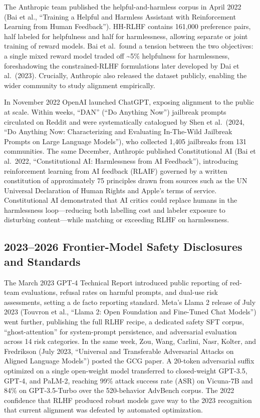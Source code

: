 \documentclass{article}
\begin{document}
The Anthropic team published the helpful-and-harmless corpus in April 2022 (Bai et al., ``Training a Helpful and Harmless Assistant with Reinforcement Learning from Human Feedback''). HH-RLHF contains 161,000 preference pairs, half labeled for helpfulness and half for harmlessness, allowing separate or joint training of reward models. Bai et al.~found a tension between the two objectives: a single mixed reward model traded off \textasciitilde5\% helpfulness for harmlessness, foreshadowing the constrained-RLHF formulations later developed by Dai et al.~(2023). Crucially, Anthropic also released the dataset publicly, enabling the wider community to study alignment empirically.

In November 2022 OpenAI launched ChatGPT, exposing alignment to the public at scale. Within weeks, ``DAN'' (``Do Anything Now'') jailbreak prompts circulated on Reddit and were systematically catalogued by Shen et al.~(2024, ``Do Anything Now: Characterizing and Evaluating In-The-Wild Jailbreak Prompts on Large Language Models''), who collected 1,405 jailbreaks from 131 communities. The same December, Anthropic published Constitutional AI (Bai et al.~2022, ``Constitutional AI: Harmlessness from AI Feedback''), introducing reinforcement learning from AI feedback (RLAIF) governed by a written constitution of approximately 75 principles drawn from sources such as the UN Universal Declaration of Human Rights and Apple's terms of service. Constitutional AI demonstrated that AI critics could replace humans in the harmlessness loop---reducing both labelling cost and labeler exposure to disturbing content---while matching or exceeding RLHF on harmlessness.

\subsection{2023--2026 Frontier-Model Safety Disclosures and Standards}\label{frontier-model-safety-disclosures-and-standards}

The March 2023 GPT-4 Technical Report introduced public reporting of red-team evaluations, refusal rates on harmful prompts, and dual-use risk assessments, setting a de facto reporting standard. Meta's Llama 2 release of July 2023 (Touvron et al., ``Llama 2: Open Foundation and Fine-Tuned Chat Models'') went further, publishing the full RLHF recipe, a dedicated safety SFT corpus, ``ghost-attention'' for system-prompt persistence, and adversarial evaluation across 14 risk categories. In the same week, Zou, Wang, Carlini, Nasr, Kolter, and Fredrikson (July 2023, ``Universal and Transferable Adversarial Attacks on Aligned Language Models'') posted the GCG paper. A 20-token adversarial suffix optimized on a single open-weight model transferred to closed-weight GPT-3.5, GPT-4, and PaLM-2, reaching 99\% attack success rate (ASR) on Vicuna-7B and 84\% on GPT-3.5-Turbo over the 520-behavior AdvBench corpus. The 2022 confidence that RLHF produced robust models gave way to the 2023 recognition that current alignment was defeated by automated optimization.
\end{document}
